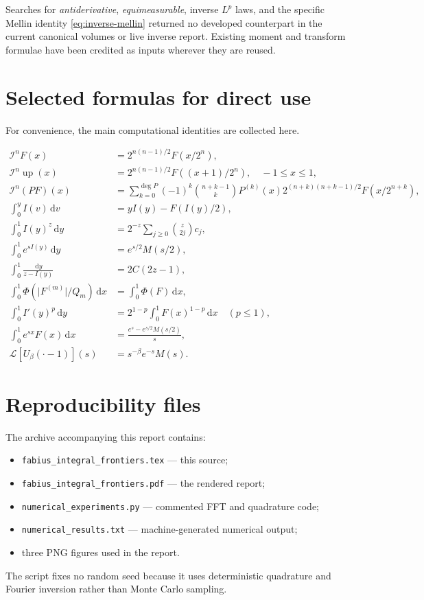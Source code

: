 \documentclass[11pt]{article}
\theoremstyle{definition}
\theoremstyle{remark}
\DeclareMathOperator{\upf}{up}
\newcommand{\dd}{\,\mathrm d}
\newcommand{\Iop}{\mathcal I}
\newcommand{\Lap}{\mathcal L}
\newcommand{\abs}[1]{\lvert#1\rvert}
\begin{document}
Searches for \emph{antiderivative}, \emph{equimeasurable}, inverse \(L^p\) laws, and the
specific Mellin identity \eqref{eq:inverse-mellin} returned no developed counterpart in
the current canonical volumes or live inverse report.  Existing moment and transform
formulae have been credited as inputs wherever they are reused.

\section{Selected formulas for direct use}

For convenience, the main computational identities are collected here.

\begin{align*}
 \Iop^nF(x)&=2^{n(n-1)/2}F(x/2^n),\\
 \Iop^n\upf(x)&=2^{n(n-1)/2}F((x+1)/2^n),\quad -1\le x\le1,\\
 \Iop^n(PF)(x)&=\sum_{k=0}^{\deg P}(-1)^k\binom{n+k-1}{k}
 P^{(k)}(x)2^{(n+k)(n+k-1)/2}F(x/2^{n+k}),\\
 \int_0^yI(v)\dd v&=yI(y)-F(I(y)/2),\\
 \int_0^1I(y)^z\dd y&=2^{-z}\sum_{j\ge0}\binom z{2j}c_j,\\
 \int_0^1e^{sI(y)}\dd y&=e^{s/2}M(s/2),\\
 \int_0^1\frac{\dd y}{z-I(y)}&=2C(2z-1),\\
 \int_0^1\Phi(\abs{F^{(m)}}/Q_m)\dd x&=\int_0^1\Phi(F)\dd x,\\
 \int_0^1I'(y)^p\dd y&=2^{1-p}\int_0^1F(x)^{1-p}\dd x\quad(p\le1),\\
 \int_0^1e^{sx}F(x)\dd x&=\frac{e^s-e^{s/2}M(s/2)}s,\\
 \Lap[U_\beta(\cdot-1)](s)&=s^{-\beta}e^{-s}M(s).
\end{align*}

\section{Reproducibility files}

The archive accompanying this report contains:
\begin{itemize}
 \item \texttt{fabius\_integral\_frontiers.tex} --- this source;
 \item \texttt{fabius\_integral\_frontiers.pdf} --- the rendered report;
 \item \texttt{numerical\_experiments.py} --- commented FFT and quadrature code;
 \item \texttt{numerical\_results.txt} --- machine-generated numerical output;
 \item three PNG figures used in the report.
\end{itemize}
The script fixes no random seed because it uses deterministic quadrature and
Fourier inversion rather than Monte Carlo sampling.
\end{document}
